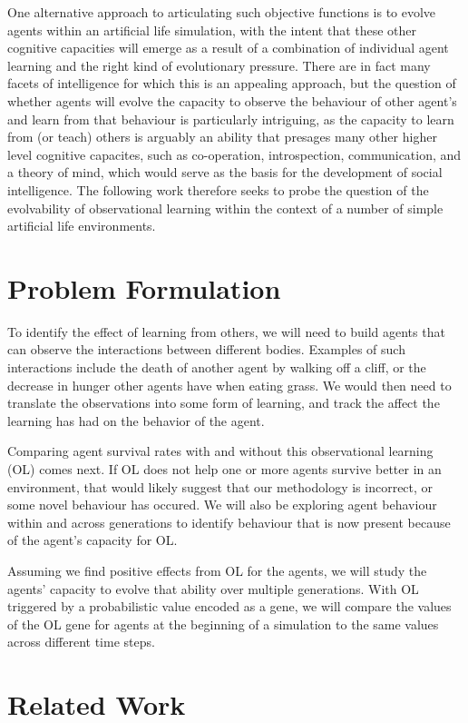\documentclass[letterpaper]{article}
\numberwithin{equation}{section}
\numberwithin{theorem}{section}
\numberwithin{lemma}{section}
\numberwithin{df}{section}
\begin{document}
One alternative approach to articulating such objective functions is to evolve agents within an artificial life simulation, with the intent that these other cognitive capacities will emerge as a result of a combination of individual agent learning and the right kind of evolutionary pressure. There are in fact many facets of intelligence for which this is an appealing approach, but the question of whether agents will evolve the capacity to observe the behaviour of other agent's and learn from that behaviour is particularly intriguing, as the capacity to learn from (or teach) others is arguably an ability that presages many other higher level cognitive capacites, such as co-operation, introspection, communication, and a theory of mind, which would serve as the basis for the development of social intelligence. The following work therefore seeks to probe the question of the evolvability of observational learning within the context of a number of simple artificial life environments.

\section{Problem Formulation}

To identify the effect of learning from others, we will need to build agents that can observe the interactions between different bodies.  Examples of such interactions  include the death of another agent by walking off a cliff, or the decrease in hunger other agents have when eating grass.  We would then need to translate the observations into some form of learning, and track the affect the learning has had on the behavior of the agent.

Comparing agent survival rates with and without this observational learning (OL) comes next. If OL does not help one or more agents survive better in an environment, that would likely suggest that our methodology is incorrect, or some novel behaviour has occured.  We will also be exploring agent behaviour within and across generations to identify behaviour that is now present because of the agent's capacity for OL.

Assuming we find positive effects from OL for the agents, we will study the agents' capacity to evolve that ability over multiple generations.  With OL triggered by a probabilistic value  encoded as a gene, we will compare the values of the OL gene for agents at the beginning of a simulation to the same values across different time steps.

\section{Related Work}
\end{document}
